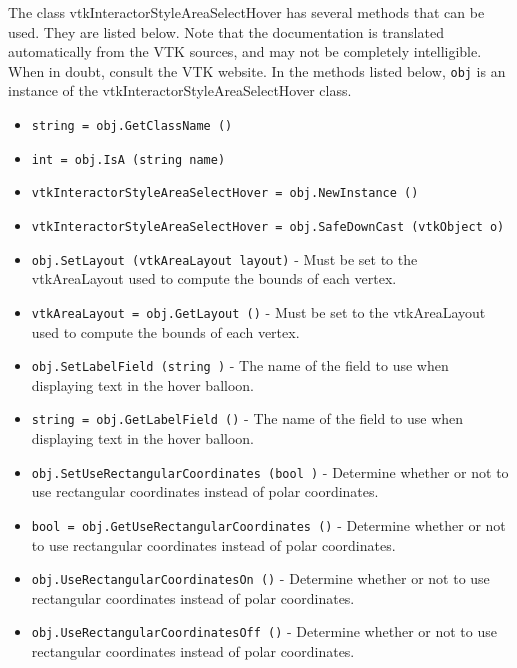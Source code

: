 The class vtkInteractorStyleAreaSelectHover has several methods that can be used.
  They are listed below.
Note that the documentation is translated automatically from the VTK sources,
and may not be completely intelligible.  When in doubt, consult the VTK website.
In the methods listed below, \verb|obj| is an instance of the vtkInteractorStyleAreaSelectHover class.
\begin{itemize}
\item  \verb|string = obj.GetClassName ()|

\item  \verb|int = obj.IsA (string name)|

\item  \verb|vtkInteractorStyleAreaSelectHover = obj.NewInstance ()|

\item  \verb|vtkInteractorStyleAreaSelectHover = obj.SafeDownCast (vtkObject o)|

\item  \verb|obj.SetLayout (vtkAreaLayout layout)| -  Must be set to the vtkAreaLayout used to compute the bounds of
 each vertex.

\item  \verb|vtkAreaLayout = obj.GetLayout ()| -  Must be set to the vtkAreaLayout used to compute the bounds of
 each vertex.

\item  \verb|obj.SetLabelField (string )| -  The name of the field to use when displaying text in the hover balloon.

\item  \verb|string = obj.GetLabelField ()| -  The name of the field to use when displaying text in the hover balloon.

\item  \verb|obj.SetUseRectangularCoordinates (bool )| -  Determine whether or not to use rectangular coordinates instead of
 polar coordinates.

\item  \verb|bool = obj.GetUseRectangularCoordinates ()| -  Determine whether or not to use rectangular coordinates instead of
 polar coordinates.

\item  \verb|obj.UseRectangularCoordinatesOn ()| -  Determine whether or not to use rectangular coordinates instead of
 polar coordinates.

\item  \verb|obj.UseRectangularCoordinatesOff ()| -  Determine whether or not to use rectangular coordinates instead of
 polar coordinates.


\end{itemize}
